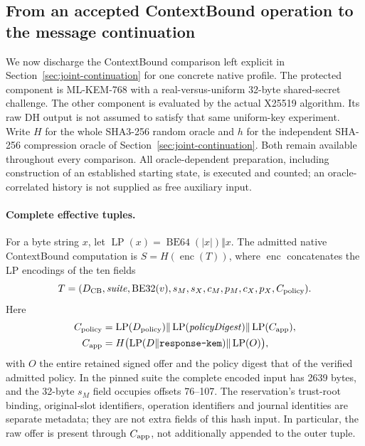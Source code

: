 \subsection{From an accepted ContextBound operation to the message continuation}
\label{sec:contextbound-connection}

We now discharge the ContextBound comparison left explicit in
Section~\ref{sec:joint-continuation} for one concrete native profile.
The protected component is ML-KEM-768 with a real-versus-uniform 32-byte
shared-secret challenge. The other component is evaluated by the actual
X25519 algorithm. Its raw DH output is not assumed to satisfy that same
uniform-key experiment. Write $H$ for the whole SHA3-256 random oracle and
$h$ for the independent SHA-256 compression oracle of
Section~\ref{sec:joint-continuation}. Both remain available throughout every
comparison. All oracle-dependent preparation, including construction of an
established starting state, is executed and counted; an oracle-correlated
history is not supplied as free auxiliary input.

\paragraph{Complete effective tuples.}
For a byte string $x$, let
$\operatorname{LP}(x)=\operatorname{BE64}(|x|)\Vert x$.
The admitted native ContextBound computation is $S=H(\operatorname{enc}(T))$,
where $\operatorname{enc}$ concatenates the LP encodings of the ten fields
\[
 T=(D_{\rm CB},\mathit{suite},\operatorname{BE32}(v),
 s_M,s_X,c_M,p_M,c_X,p_X,C_{\rm policy}).
\]
Here
\[
\begin{aligned}
 C_{\rm policy}
 &=\operatorname{LP}(D_{\rm policy})
   \Vert\operatorname{LP}(\mathit{policyDigest})
   \Vert\operatorname{LP}(C_{\rm app}),\\
 C_{\rm app}
 &=H\bigl(\operatorname{LP}(D\Vert\texttt{response-kem})
                \Vert\operatorname{LP}(O)\bigr),
\end{aligned}
\]
with $O$ the entire retained signed offer and the policy digest that of the
verified admitted policy. In the pinned suite the complete encoded input
has 2639 bytes, and the 32-byte $s_M$ field occupies offsets 76--107.
The reservation's trust-root binding, original-slot identifiers, operation
identifiers and journal identities are separate metadata; they are not
extra fields of this hash input. In particular, the raw offer is present
through $C_{\rm app}$, not additionally appended to the outer tuple.

